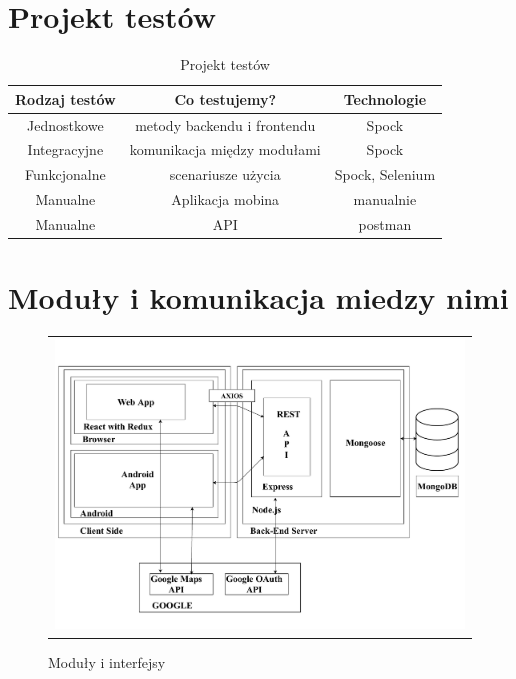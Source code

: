 \documentclass{sprawozdanie-agh}
\begin{document}
   


	\stronatytulowa{}

	\section{Projekt testów}
	
	\begin{table}[h]
		\centering
		\begin{tabular}{|c|c|c|}
			\hline
			\textbf{Rodzaj testów} & \textbf{Co testujemy?} & \textbf{Technologie} \\
			\hline
			Jednostkowe & metody backendu i frontendu & Spock \\ \hline
			Integracyjne & komunikacja między modułami & Spock \\ \hline
			Funkcjonalne & scenariusze użycia & Spock, Selenium \\ \hline
			Manualne & Aplikacja mobina & manualnie \\ \hline
			Manualne & API & postman \\ \hline
		\end{tabular}
		\caption{Projekt testów}
	\end{table}

	\section{Moduły i komunikacja miedzy nimi}
	\begin{figure}[H] 
		\centering
		\begin{tabular}{c}
			\includegraphics[width=.95\textwidth]{moduly_interfejsy_komunikacyjne} 
		\end{tabular} 
		\caption{Moduły i interfejsy}
	\end{figure}
\end{document}
